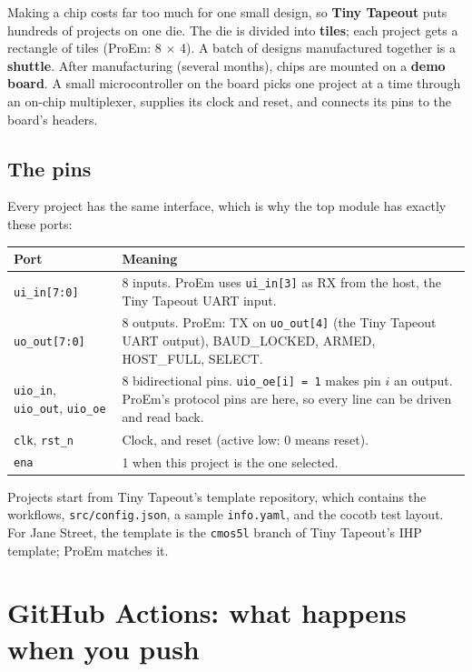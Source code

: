 \documentclass[11pt,a4paper]{article}
\newcommand{\file}[1]{\texttt{#1}}
\begin{document}
Making a chip costs far too much for one small design, so \textbf{Tiny Tapeout} puts hundreds of projects on one die. The die is divided into \textbf{tiles}; each project gets a rectangle of tiles (ProEm: 8 $\times$ 4). A batch of designs manufactured together is a \textbf{shuttle}. After manufacturing (several months), chips are mounted on a \textbf{demo board}. A small microcontroller on the board picks one project at a time through an on-chip multiplexer, supplies its clock and reset, and connects its pins to the board's headers.

\subsection{The pins}

Every project has the same interface, which is why the top module has exactly these ports:

\begin{center}
\begin{tabularx}{\linewidth}{@{}lL@{}}
\toprule
Port & Meaning \\
\midrule
\texttt{ui\_in[7:0]} & 8 inputs. ProEm uses \texttt{ui\_in[3]} as RX from the host, the Tiny Tapeout UART input. \\
\texttt{uo\_out[7:0]} & 8 outputs. ProEm: TX on \texttt{uo\_out[4]} (the Tiny Tapeout UART output), BAUD\_LOCKED, ARMED, HOST\_FULL, SELECT. \\
\texttt{uio\_in}, \texttt{uio\_out}, \texttt{uio\_oe} & 8 bidirectional pins. \texttt{uio\_oe[i] = 1} makes pin $i$ an output. ProEm's protocol pins are here, so every line can be driven and read back. \\
\texttt{clk}, \texttt{rst\_n} & Clock, and reset (active low: 0 means reset). \\
\texttt{ena} & 1 when this project is the one selected. \\
\bottomrule
\end{tabularx}
\end{center}

Projects start from Tiny Tapeout's template repository, which contains the workflows, \file{src/config.json}, a sample \file{info.yaml}, and the cocotb test layout. For Jane Street, the template is the \texttt{cmos5l} branch of Tiny Tapeout's IHP template; ProEm matches it.

\section{GitHub Actions: what happens when you push}\label{sec:actions}
\end{document}
